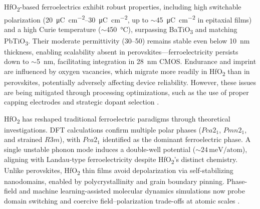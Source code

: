 \documentclass[a4paper,fleqn]{cas-sc}
\begin{document}
\par HfO\textsubscript{2}-based ferroelectrics exhibit robust properties, including high switchable polarization (\SIrange{20}{30}{\micro\coulomb\per\square\centi\meter}, up to $\sim$\SI{45}{\micro\coulomb\per\square\centi\meter} in epitaxial films) and a high Curie temperature ($\sim$\SI{450}{\degreeCelsius}), surpassing BaTiO\textsubscript{3} and matching PbTiO\textsubscript{3}. Their moderate permittivity (\numrange{30}{50}) remains stable even below \SI{10}{\nano\meter} thickness, enabling scalability absent in perovskites---ferroelectricity persists down to $\sim$\SI{5}{\nano\meter}, facilitating integration in \SI{28}{\nano\meter} CMOS. Endurance and imprint are influenced by oxygen vacancies, which migrate more readily in HfO\textsubscript{2} than in perovskites, potentially adversely affecting device reliability. However, these issues are being mitigated through processing optimizations, such as the use of proper capping electrodes and strategic dopant selection \cite{Shimizu2016,Zhu2024}.
\par HfO\textsubscript{2} has reshaped traditional ferroelectric paradigms through theoretical investigations. DFT calculations confirm multiple polar phases ($Pca2_{1}$, $Pmn2_{1}$, and strained $R3m$), with $Pca2_{1}$ identified as the dominant ferroelectric phase. A single unstable phonon mode induces a double-well potential ($\sim\!24\,\mathrm{meV}/\text{atom}$), aligning with Landau-type ferroelectricity despite HfO\textsubscript{2}'s distinct chemistry. Unlike perovskites, HfO\textsubscript{2} thin films avoid depolarization via self-stabilizing nanodomains, enabled by polycrystallinity and grain boundary pinning. Phase-field and machine learning-assisted molecular dynamics simulations now probe domain switching and coercive field--polarization trade-offs at atomic scales \cite{Raeliarijaona2023,Zhu2024}.
\end{document}
